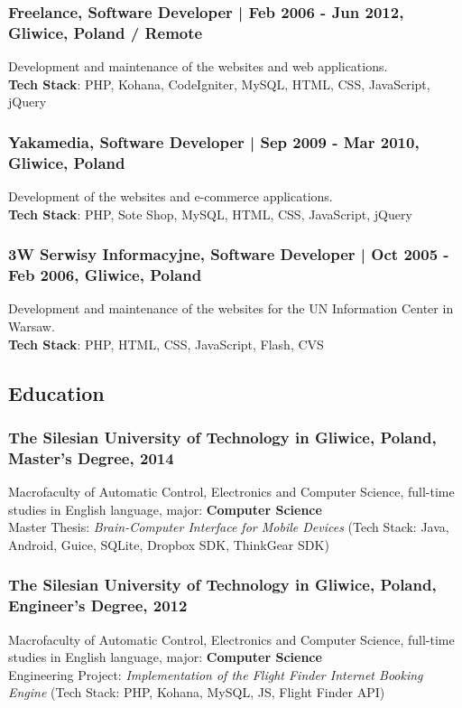 \documentclass[8pt]{extarticle}
\begin{document}
      \subsubsection*{\normalsize{Freelance, Software Developer | Feb 2006 - Jun 2012, Gliwice, Poland / Remote}}
      Development and maintenance of the websites and web applications.\\
      \textbf{Tech Stack}: PHP, Kohana, CodeIgniter, MySQL, HTML, CSS, JavaScript, jQuery

      \subsubsection*{\normalsize{Yakamedia, Software Developer | Sep 2009 - Mar 2010, Gliwice, Poland}}
      Development of the websites and e-commerce applications.\\
      \textbf{Tech Stack}: PHP, Sote Shop, MySQL, HTML, CSS, JavaScript, jQuery

      \subsubsection*{\normalsize{3W Serwisy Informacyjne, Software Developer | Oct 2005 - Feb 2006, Gliwice, Poland}}
      Development and maintenance of the websites for the UN Information Center in Warsaw.\\
      \textbf{Tech Stack}: PHP, HTML, CSS, JavaScript, Flash, CVS

    \subsection*{\normalsize{Education}}

      \subsubsection*{\normalsize{The Silesian University of Technology in Gliwice, Poland, Master's Degree, 2014}}
      Macrofaculty of Automatic Control, Electronics and Computer Science,
      full-time studies in English language, major: \textbf{Computer Science}\\
      Master Thesis: \textit{Brain-Computer Interface for Mobile Devices}
      (Tech Stack: Java, Android, Guice, SQLite, Dropbox SDK, ThinkGear SDK)

      \subsubsection*{\normalsize{The Silesian University of Technology in Gliwice, Poland, Engineer's Degree, 2012}}
      Macrofaculty of Automatic Control, Electronics and Computer Science,
      full-time studies in English language, major: \textbf{Computer Science}\\
      Engineering Project: \textit{Implementation of the Flight Finder Internet Booking Engine}
      (Tech Stack: PHP, Kohana, MySQL, JS, Flight Finder API)
\end{document}
